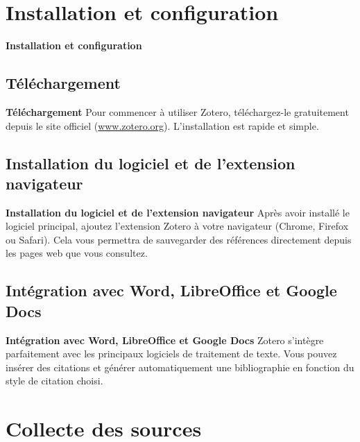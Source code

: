 \documentclass{beamer}
\begin{document}
\section{Installation et configuration}
\begin{frame}{\textbf{Installation et configuration}}


\subsection{Téléchargement}
	\begin{block}{\textbf{Téléchargement}}
		Pour commencer à utiliser Zotero, téléchargez-le gratuitement depuis le site officiel (\url{www.zotero.org}). L'installation est rapide et simple.
	
	\end{block}
	
	
\subsection{Installation du logiciel et de l’extension navigateur}	
\begin{block}{\textbf{Installation du logiciel et de l’extension navigateur}}
Après avoir installé le logiciel principal, ajoutez l'extension Zotero à votre navigateur (Chrome, Firefox ou Safari). Cela vous permettra de sauvegarder des références directement depuis les pages web que vous consultez.
\end{block}
	
	
\subsection{Intégration avec Word, LibreOffice et Google Docs}
\begin{block}{\textbf{Intégration avec Word, LibreOffice et Google Docs}}
Zotero s'intègre parfaitement avec les principaux logiciels de traitement de texte. Vous pouvez insérer des citations et générer automatiquement une bibliographie en fonction du style de citation choisi.
\end{block}
\end{frame}

\section{Collecte des sources}
\end{document}
